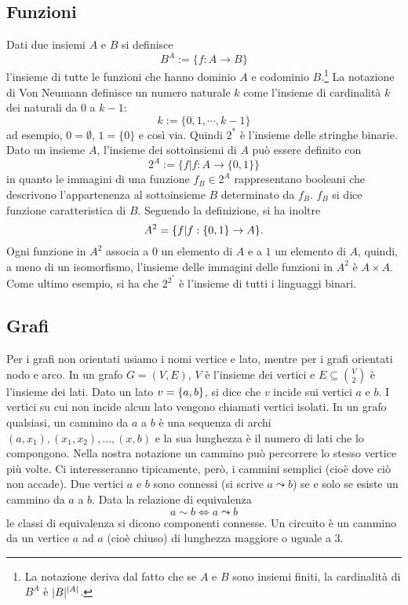\subsection*{Funzioni}
Dati due insiemi $A$ e $B$ si definisce
\begin{equation*}
	B^A := \{f : A \to B\}
\end{equation*}
l'insieme di tutte le funzioni che hanno dominio $A$ e codominio $B$.\footnote{La notazione deriva dal fatto che se $A$ e $B$ sono insiemi finiti, la cardinalità di $B^A$ è $| B |^{| A |}$.}
La notazione di Von Neumann definisce un numero naturale $k$ come l'insieme di cardinalità $k$ dei naturali da $0$ a $k-1$:
\begin{equation*}
	k := \{0,1,\cdots,k-1\}
\end{equation*}
ad esempio, $0 = \emptyset$, $1 = \{0\}$ e così via. Quindi $2^*$ è l'insieme delle stringhe binarie.
Dato un insieme $A$, l'insieme dei sottoinsiemi di $A$ può essere definito con
\begin{equation*}
	2^A := \{f | f: A \to \{0,1\}\}
\end{equation*}
in quanto le immagini di una funzione $f_B\in2^A$ rappresentano booleani che descrivono l'appartenenza al sottoinsieme $B$ determinato da $f_B$. $f_B$ si dice funzione caratteristica di $B$.
Seguendo la definizione, si ha inoltre
\begin{equation*}
	A^2 = \{f| f: \{0,1\} \to A\}\text.
\end{equation*}
Ogni funzione in $A^2$ associa a $0$ un elemento di $A$ e a $1$ un elemento di $A$, quindi, a meno di un isomorfismo, l'insieme delle immagini delle funzioni in $A^2$ è $A \times A$.
Come ultimo esempio, si ha che $2^{2^*}$ è l'insieme di tutti i linguaggi binari.


\subsection*{Grafi}
Per i grafi non orientati usiamo i nomi vertice e lato, mentre per i grafi orientati nodo e arco. In un grafo $G=(V,E)$, $V$ è l'insieme dei vertici e $E\subseteq\binom{V}{2}$ è l'insieme dei lati.
Dato un lato $v=\left\{ a,b \right\}$, si dice che $v$ incide sui vertici $a$ e $b$. I vertici su cui non incide alcun lato vengono chiamati vertici isolati.
In un grafo qualsiasi, un cammino da $a$ a $b$ è una sequenza di archi $(a,x_1),(x_1,x_2),\dots,(x,b)$ e la sua lunghezza è il numero di lati che lo compongono. Nella nostra notazione un cammino può percorrere lo stesso vertice più volte. Ci interesseranno tipicamente, però, i cammini semplici (cioè dove ciò non accade). Due vertici $a$ e $b$ sono connessi (si scrive $a\leadsto b$) se e solo se esiste un cammino da $a$ a $b$. Data la relazione di equivalenza
\begin{equation*}
	a\sim b \iff a\leadsto b
\end{equation*}
le classi di equivalenza si dicono componenti connesse. Un circuito è un cammino da un vertice $a$ ad $a$ (cioè chiuso) di lunghezza maggiore o uguale a $3$.

